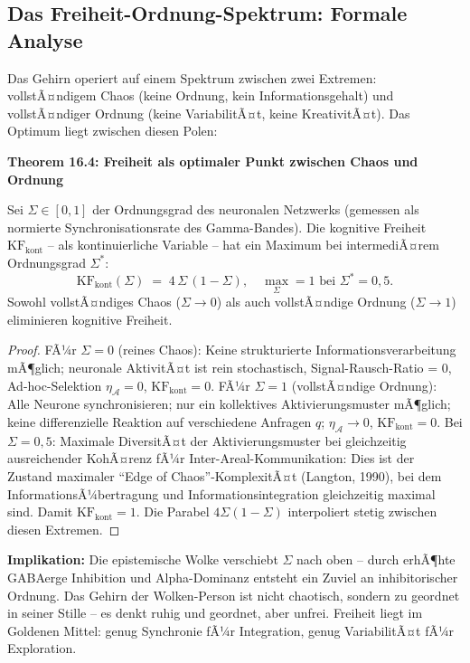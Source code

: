 ﻿\documentclass[12pt,a4paper]{report}
\theoremstyle{plain}
\theoremstyle{definition}
\theoremstyle{remark}
\begin{document}
	\subsection{Das Freiheit-Ordnung-Spektrum: Formale Analyse}

	Das Gehirn operiert auf einem Spektrum zwischen zwei Extremen:
	vollstÃ¤ndigem Chaos (keine Ordnung, kein Informationsgehalt)
	und vollstÃ¤ndiger Ordnung (keine VariabilitÃ¤t, keine KreativitÃ¤t).
	Das Optimum liegt zwischen diesen Polen:

	
	\noindent\textbf{Theorem 16.4: Freiheit als optimaler Punkt zwischen Chaos und Ordnung}

		Sei $\Sigma \in [0,1]$ der Ordnungsgrad des neuronalen Netzwerks
		(gemessen als normierte Synchronisationsrate des Gamma-Bandes).
		Die kognitive Freiheit $\mathrm{KF}_{\mathrm{kont}}$ -- als
		kontinuierliche Variable -- hat ein Maximum bei intermediÃ¤rem
		Ordnungsgrad $\Sigma^*$:
		\[
		\mathrm{KF}_{\mathrm{kont}}(\Sigma)
		\;=\; 4\,\Sigma\,(1-\Sigma),
		\quad
		\max_\Sigma = 1 \text{ bei } \Sigma^* = 0{,}5.
		\]
		Sowohl vollstÃ¤ndiges Chaos ($\Sigma \to 0$) als auch
		vollstÃ¤ndige Ordnung ($\Sigma \to 1$) eliminieren kognitive Freiheit.


	\begin{proof}
		FÃ¼r $\Sigma = 0$ (reines Chaos): Keine strukturierte Informationsverarbeitung
		mÃ¶glich; neuronale AktivitÃ¤t ist rein stochastisch, Signal-Rausch-Ratio = 0,
		Ad-hoc-Selektion $\eta_\mathcal{A} = 0$, $\mathrm{KF}_{\mathrm{kont}} = 0$.
		FÃ¼r $\Sigma = 1$ (vollstÃ¤ndige Ordnung): Alle Neurone synchronisieren;
		nur ein kollektives Aktivierungsmuster mÃ¶glich; keine differenzielle
		Reaktion auf verschiedene Anfragen $q$; $\eta_\mathcal{A} \to 0$,
		$\mathrm{KF}_{\mathrm{kont}} = 0$.
		Bei $\Sigma = 0{,}5$: Maximale DiversitÃ¤t der Aktivierungsmuster bei
		gleichzeitig ausreichender KohÃ¤renz fÃ¼r Inter-Areal-Kommunikation:
		Dies ist der Zustand maximaler ``Edge of Chaos''-KomplexitÃ¤t
		(Langton, 1990), bei dem InformationsÃ¼bertragung und Informationsintegration
		gleichzeitig maximal sind. Damit $\mathrm{KF}_{\mathrm{kont}} = 1$.
		Die Parabel $4\Sigma(1-\Sigma)$ interpoliert stetig zwischen diesen Extremen. \hfill
	\end{proof}

	\textbf{Implikation:}
	Die epistemische Wolke verschiebt $\Sigma$ nach oben -- durch
	erhÃ¶hte GABAerge Inhibition und Alpha-Dominanz entsteht ein
	Zuviel an inhibitorischer Ordnung. Das Gehirn der Wolken-Person
	ist nicht chaotisch, sondern zu geordnet in seiner Stille --
	es denkt ruhig und geordnet, aber unfrei.
	Freiheit liegt im Goldenen Mittel: genug Synchronie fÃ¼r Integration,
	genug VariabilitÃ¤t fÃ¼r Exploration.
\end{document}
